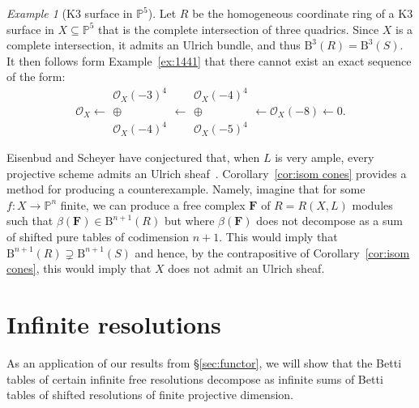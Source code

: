 \documentclass[12pt]{amsart}
\theoremstyle{definition}
\theoremstyle{remark}
\newtheorem{example}[lemma]{Example}
\newtheorem{remark}[lemma]{Remark}
\newcommand{\PP}{\mathbb{P}}
\newcommand{\cO}{\mathcal{O}}
\newcommand{\FF}{\mathbf{F}}
\newcommand{\BBQ}{\mathrm{B}}
\begin{document}
\begin{example}[K3 surface in $\PP^5$]
Let $R$ be the homogeneous coordinate ring of a K3 surface in $X\subseteq \PP^5$ that is the complete intersection of three quadrics. 
Since $X$ is a complete intersection, it admits an Ulrich bundle, and thus $\BBQ^3(R)=\BBQ^3(S)$.  It then follows form Example~\ref{ex:1441} that there cannot exist an exact sequence of the form:
\[
\cO_X\longleftarrow \begin{matrix}  \cO_X(-3)^4\\ \oplus\\ \cO_X(-4)^4\end{matrix}\longleftarrow \begin{matrix} \cO_X(-4)^4\\ \oplus\\ \cO_X(-5)^4\end{matrix} \longleftarrow \cO_X(-8)\longleftarrow 0.
\]
\end{example}



Eisenbud and Scheyer have conjectured that, when $L$ is very ample, every projective scheme admits an Ulrich sheaf~\cite[p. 543]{eis-schrey-chow}.  Corollary~\ref{cor:isom cones} provides a method for producing a counterexample.  Namely, imagine that for some $f\colon X\to \PP^n$ finite, we can produce a free complex $\FF$ of $R=R(X,L)$ modules such that $\beta(\FF)\in \BBQ^{n+1}(R)$ but where $\beta(\FF)$ does not decompose as a sum of shifted pure tables of codimension $n+1$.  This would imply that $\BBQ^{n+1}(R)\supsetneq \BBQ^{n+1}(S)$ and hence, by the contrapositive of Corollary~\ref{cor:isom cones}, this would imply that $X$ does not admit an Ulrich sheaf.


\section{Infinite resolutions}\label{sec:infinite}
As an application of our results from \S\ref{sec:functor}, we will show that the Betti tables of certain infinite free resolutions decompose as infinite sums of Betti tables of shifted resolutions of finite projective dimension.
\end{document}
